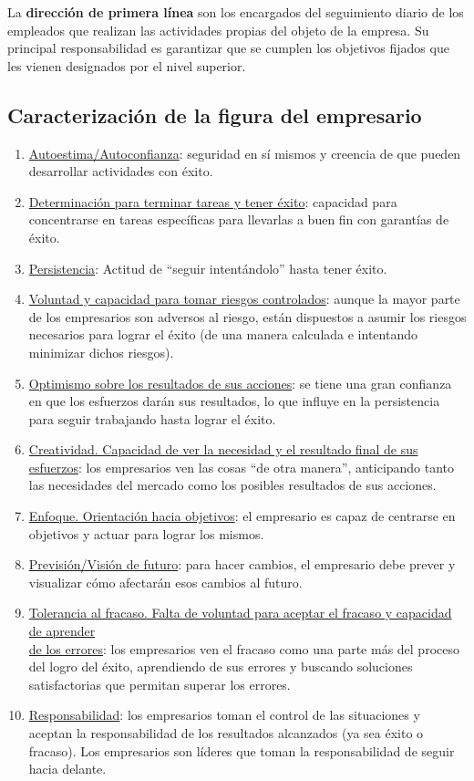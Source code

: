 \documentclass[12pt]{article}
\theoremstyle{definition_wo_parentheses}
\begin{document}
La \textbf{dirección de primera línea} son los encargados del seguimiento diario de los empleados que realizan las actividades propias del objeto de la empresa. Su principal responsabilidad es garantizar que se cumplen los objetivos fijados que les vienen designados por el nivel superior.

\subsection{Caracterización de la figura del empresario}
\begin{enumerate}
\item \underline{Autoestima/Autoconfianza}: seguridad en sí mismos y creencia de que pueden desarrollar actividades con éxito.
\item \underline{Determinación para terminar tareas y tener éxito}: capacidad para concentrarse en tareas específicas para llevarlas a buen fin con garantías de éxito.
\item \underline{Persistencia}: Actitud de ``seguir intentándolo'' hasta tener éxito.
\item \underline{Voluntad y capacidad para tomar riesgos controlados}: aunque la mayor parte de los empresarios son adversos al riesgo, están dispuestos a asumir los riesgos necesarios para lograr el éxito (de una manera calculada e intentando minimizar dichos riesgos).
\item \underline{Optimismo sobre los resultados de sus acciones}: se tiene una gran confianza en que los esfuerzos darán sus resultados, lo que influye en la persistencia para seguir trabajando hasta lograr el éxito.
\item \underline{Creatividad. Capacidad de ver la necesidad y el resultado final de sus esfuerzos}: los empresarios ven las cosas ``de otra manera'', anticipando tanto las necesidades del mercado como los posibles resultados de sus acciones.
\item \underline{Enfoque. Orientación hacia objetivos}: el empresario es capaz de centrarse en objetivos y actuar para lograr los mismos.
\item \underline{Previsión/Visión de futuro}: para hacer cambios, el empresario debe prever y visualizar cómo afectarán esos cambios al futuro.
\item \underline{Tolerancia al fracaso. Falta de voluntad para aceptar el fracaso y capacidad de aprender}\\ \underline{de los errores}: los empresarios ven el fracaso como una parte más del proceso del logro del éxito, aprendiendo de sus errores y buscando soluciones satisfactorias que permitan superar los errores.
\item \underline{Responsabilidad}: los empresarios toman el control de las situaciones y aceptan la responsabilidad de los resultados alcanzados (ya sea éxito o fracaso). Los empresarios son líderes que toman la responsabilidad de seguir hacia delante.
\end{enumerate}
\end{document}
